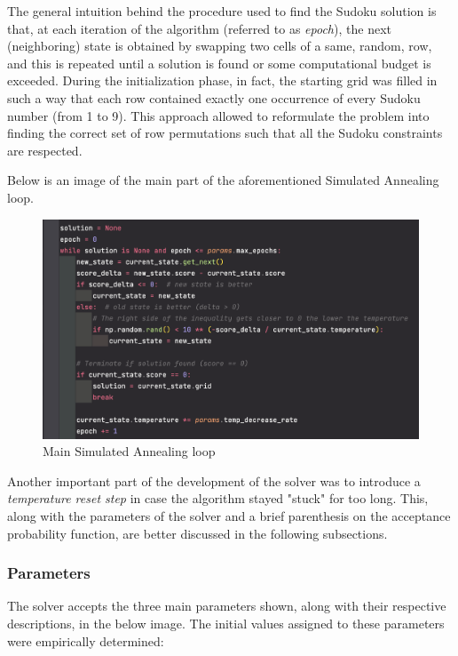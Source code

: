 The general intuition behind the procedure used to find the Sudoku solution is that, at each iteration of the algorithm (referred to as \textit{epoch}), the next (neighboring) state is obtained by swapping two cells of a same, random, row, and this is repeated until a solution is found or some computational budget is exceeded. During the initialization phase, in fact, the starting grid was filled in such a way that each row contained exactly one occurrence of every Sudoku number (from 1 to 9). This approach allowed to reformulate the problem into finding the correct set of row permutations such that all the Sudoku constraints are respected.
\par
Below is an image of the main part of the aforementioned Simulated Annealing loop.

\begin{figure}[h]
    \centering
    \includegraphics[scale=0.65]{assignment-1/images/sim_ann/main-2-body.png}
    \caption{Main Simulated Annealing loop}
    \label{fig:ann_main_1}
\end{figure}

\par
Another important part of the development of the solver was to introduce a \textit{temperature reset step} in case the algorithm stayed "stuck" for too long. This, along with the parameters of the solver and a brief parenthesis on the acceptance probability function, are better discussed in the following subsections.

\subsubsection{Parameters}

The solver accepts the three main parameters shown, along with their respective descriptions, in the below image. The initial values assigned to these parameters were empirically determined:

